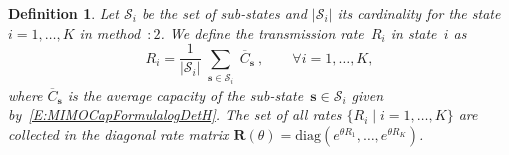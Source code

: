 \documentclass[10pt,conference]{IEEEtran}
\newtheorem{defn}[theorem]{Definition}
\newcommand{\rate}{R}
\newcommand{\barZi}{|\mathcal{S}_{i}|}
\begin{document}
\begin{defn}

Let $\mathcal{S}_i$ be the set of sub-states and $\barZi$ its cardinality for the state $i=1,\ldots,K$ in \emph{method~$:2$}.  We define the \emph{transmission rate}~$\rate_i$ in state~$i$ as
\begin{equation}
\rate_i=\frac {1}{ \barZi}  \sum_{ \substack {\mathbf{s} \in \mathcal{S}_i } } \overline {C}_{\mathbf{s}} ~, \qquad \forall i ={1,\ldots,K} ,
\label{eq:r_i}
\end{equation}
where $\overline {C}_{\mathbf{s}}$ is the average capacity of the sub-state~$\mathbf{s}\in\mathcal{S}_i$ given by~\eqref{E:MIMOCapFormulalogDetH}.
The set of all rates $\{\rate_i \mid i = 1,\ldots,K\}$ are collected in the diagonal \emph{rate matrix} $\mathbf{R}(\theta)=\mathrm{diag}(e^{\theta \rate_1},\dots,e^{\theta \rate_K})$.
\end{defn}
\end{document}
